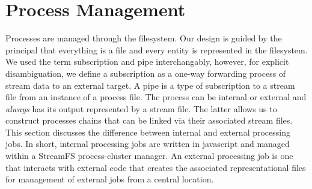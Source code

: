 \section{Process Management}

Processes are managed through the filesystem.  Our design is guided by the principal that everything is a file and
every entity is represented in the filesystem.  We used the term subscription and pipe interchangably, however, for 
explicit disambiguation, we define a subscription as a one-way forwarding process of stream data to an external
target.  A pipe is a type of subscription to a stream file from an instance of a process file.  The process can
be internal or external and \emph{always} has its output represented by a stream file.  The latter allows us
to construct processes chains that can be linked via their associated stream files.
This section discusses the difference between internal and external processing jobs.  In short, internal processing jobs
are written in javascript and managed within a StreamFS process-cluster manager.  An external processing job
is one that interacts with external code that creates the associated representational files for management 
of external jobs from a central location.

